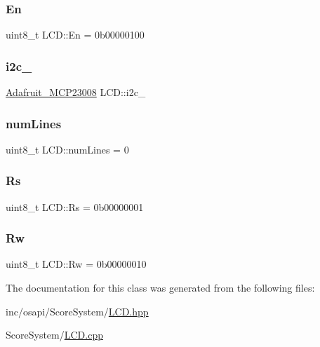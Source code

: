 \subsubsection{\texorpdfstring{En}{En}}
{\footnotesize\ttfamily uint8\+\_\+t L\+C\+D\+::\+En = 0b00000100\hspace{0.3cm}{\ttfamily [private]}}

\mbox{\label{class_l_c_d_acf92e89c3c9c9b1c99dab9f9bf72cb20}} 
\subsubsection{\texorpdfstring{i2c\+\_\+}{i2c\_}}
{\footnotesize\ttfamily \hyperlink{class_adafruit___m_c_p23008}{Adafruit\+\_\+\+M\+C\+P23008} L\+C\+D\+::i2c\+\_\+\hspace{0.3cm}{\ttfamily [private]}}

\mbox{\label{class_l_c_d_aa9a72eb7fc8bca5d8e429fa1988f26cc}} 
\subsubsection{\texorpdfstring{num\+Lines}{numLines}}
{\footnotesize\ttfamily uint8\+\_\+t L\+C\+D\+::num\+Lines = 0\hspace{0.3cm}{\ttfamily [private]}}

\mbox{\label{class_l_c_d_ab110d70390d7ee2d58a090e2b30196ad}} 
\subsubsection{\texorpdfstring{Rs}{Rs}}
{\footnotesize\ttfamily uint8\+\_\+t L\+C\+D\+::\+Rs = 0b00000001\hspace{0.3cm}{\ttfamily [private]}}

\mbox{\label{class_l_c_d_adfd73ce4fc19ae4d852bb07197201dd0}} 
\subsubsection{\texorpdfstring{Rw}{Rw}}
{\footnotesize\ttfamily uint8\+\_\+t L\+C\+D\+::\+Rw = 0b00000010\hspace{0.3cm}{\ttfamily [private]}}



The documentation for this class was generated from the following files\+:\begin{DoxyCompactItemize}
\item 
inc/osapi/\+Score\+System/\hyperlink{_l_c_d_8hpp}{L\+C\+D.\+hpp}\item 
Score\+System/\hyperlink{_l_c_d_8cpp}{L\+C\+D.\+cpp}\end{DoxyCompactItemize}

